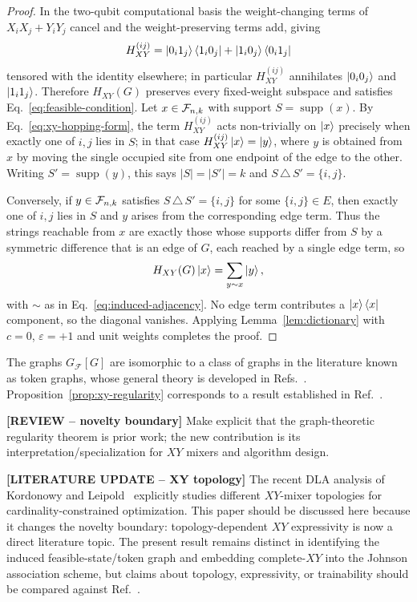 \begin{proof}
In the two-qubit computational basis the weight-changing terms of $X_iX_j+Y_iY_j$ cancel and the weight-preserving terms add, giving
\begin{equation}
H^{(ij)}_{XY} = \ket{0_i1_j}\bra{1_i0_j}+\ket{1_i0_j}\bra{0_i1_j}
    \label{eq:xy-hopping-form}
\end{equation}
tensored with the identity elsewhere; in particular $H^{(ij)}_{XY}$ annihilates $\ket{0_i0_j}$ and $\ket{1_i1_j}$. Therefore $H_{XY}(G)$ preserves every fixed-weight subspace and satisfies Eq.~\eqref{eq:feasible-condition}. Let $x\in\mathcal{F}_{n,k}$ with support $S=\operatorname{supp}(x)$. By Eq.~\eqref{eq:xy-hopping-form}, the term $H^{(ij)}_{XY}$ acts non-trivially on $\ket{x}$ precisely when exactly one of $i,j$ lies in $S$; in that case $H^{(ij)}_{XY}\ket{x}=\ket{y}$, where $y$ is obtained from $x$ by moving the single occupied site from one endpoint of the edge to the other. Writing $S'=\operatorname{supp}(y)$, this says $|S|=|S'|=k$ and $S\,\triangle\,S'=\{i,j\}$.

Conversely, if $y\in\mathcal{F}_{n,k}$ satisfies $S\,\triangle\,S'=\{i,j\}$ for some $\{i,j\}\in E$, then exactly one of $i,j$ lies in $S$ and $y$ arises from the corresponding edge term. Thus the strings reachable from $x$ are exactly those whose supports differ from $S$ by a symmetric difference that is an edge of $G$, each reached by a single edge term, so
\begin{equation}
H_{XY}(G)\ket{x}=\sum_{y\sim x}\ket{y},
\end{equation}
with $\sim$ as in Eq.~\eqref{eq:induced-adjacency}. No edge term contributes a $\ket{x}\bra{x}$ component, so the diagonal vanishes. Applying Lemma~\ref{lem:dictionary} with $c=0$, $\varepsilon=+1$ and unit weights completes the proof.
\end{proof}

The graphs $G_{\mathcal{F}}[G]$ are isomorphic to a class of graphs in the literature known as token graphs, whose general theory is developed in Refs.~\cite{FabilaMonroy2012Token,Carballosa2017Regularity}. Proposition~\ref{prop:xy-regularity} corresponds to a result established in Ref.~\cite{Carballosa2017Regularity}.

{\color{red}\textbf{[REVIEW -- novelty boundary]} Make explicit that the graph-theoretic regularity theorem is prior work; the new contribution is its interpretation/specialization for $XY$ mixers and algorithm design.}

{\color{red}\textbf{[LITERATURE UPDATE -- XY topology]} The recent DLA analysis of Kordonowy and Leipold~\cite{Kordonowy2026} explicitly studies different $XY$-mixer topologies for cardinality-constrained optimization. This paper should be discussed here because it changes the novelty boundary: topology-dependent $XY$ expressivity is now a direct literature topic. The present result remains distinct in identifying the induced feasible-state/token graph and embedding complete-$XY$ into the Johnson association scheme, but claims about topology, expressivity, or trainability should be compared against Ref.~\cite{Kordonowy2026}.}

